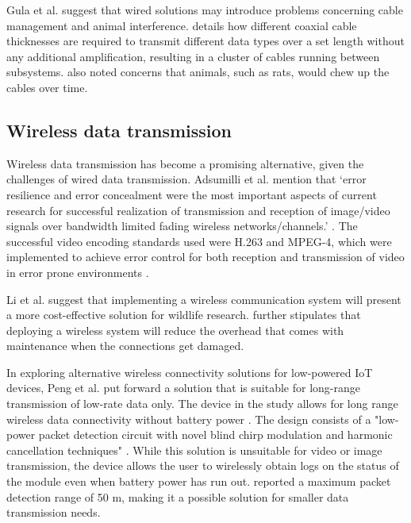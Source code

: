 \documentclass[class=report,11pt,crop=false]{standalone}
\begin{document}
Gula et al. \cite{gula2010audio} suggest that wired solutions may introduce problems concerning cable management and animal interference. \cite{gula2010audio} details how different coaxial cable thicknesses are required to transmit different data types over a set length without any additional amplification, resulting in a cluster of cables running between subsystems. \cite{gula2010audio} also noted concerns that animals, such as rats, would chew up the cables over time. 

\subsection{Wireless data transmission}

Wireless data transmission has become a promising alternative, given the challenges of wired data transmission. Adsumilli et al. mention that ‘error resilience and error concealment were the most important aspects of current research for successful realization of transmission and reception of image/video signals over bandwidth limited fading wireless networks/channels.’ \cite{adsumilli2002adaptive}. The successful video encoding standards used were H.263 and MPEG-4, which were implemented to achieve error control for both reception and transmission of video in error prone environments \cite{adsumilli2002adaptive}. 

Li et al. \cite{li2010design} suggest that implementing a wireless communication system will present a more cost-effective solution for wildlife research.  \cite{li2010design} further stipulates that deploying a wireless system will reduce the overhead that comes with maintenance when the connections get damaged.

In exploring alternative wireless connectivity solutions for low-powered IoT devices, Peng et al. \cite{peng2018plora} put forward a solution that is suitable for long-range transmission of low-rate data only. The device in the study allows for long range wireless data connectivity without battery power \cite{peng2018plora}. The design consists of a "low-power packet detection circuit with novel blind chirp modulation and harmonic cancellation techniques" \cite{peng2018plora}. While this solution is unsuitable for video or image transmission, the device allows the user to wirelessly obtain logs on the status of the module even when battery power has run out. \cite{peng2018plora} reported a maximum packet detection range of 50 m, making it a possible solution for smaller data transmission needs. 
\end{document}

